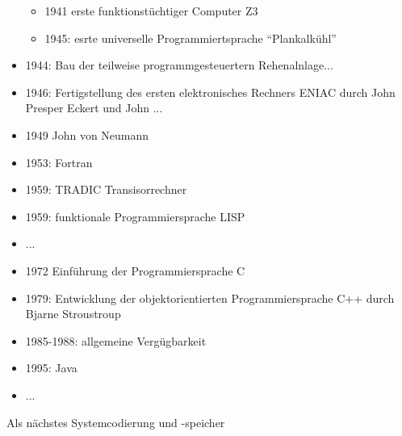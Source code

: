 \documentclass{gadsescript}
\begin{document}
\begin{itemize}
		\begin{itemize}
			\item 1941 erste funktionstüchtiger Computer Z3
			\item 1945: esrte universelle Programmiertsprache ``Plankalkühl''
		\end{itemize}
	\item 1944: Bau der teilweise programmgesteuertern Rehenalnlage...
	\item 1946: Fertigstellung des ersten elektronisches Rechners ENIAC durch John Presper Eckert und John ...
	\item 1949 John von Neumann
	\item 1953: Fortran
	\item 1959: TRADIC Transisorrechner
	\item 1959: funktionale Programmiersprache LISP
	\item ...
	\item 1972 Einführung der Programmiersprache C
	\item 1979: Entwicklung der objektorientierten Programmiersprache C++ durch Bjarne Stroustroup
	\item 1985-1988: allgemeine Vergügbarkeit
	\item 1995: Java
	\item ...
\end{itemize}

Als nächstes Systemcodierung und -speicher\\
\end{document}
